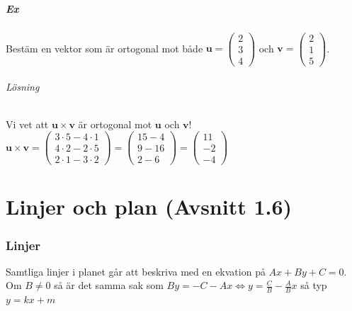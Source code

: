 \paragraph{Ex} Bestäm en vektor som är ortogonal mot både $\bm{u}=\begin{pmatrix}2\\3\\4\end{pmatrix}$ och $\bm{v}=\begin{pmatrix}2\\1\\5\end{pmatrix}$.
\subparagraph{Lösning} Vi vet att $\bm{u}\times \bm{v}$ är ortogonal mot $\bm{u}$ och $\bm{v}$!\\
$\bm{u}\times \bm{v}=\begin{pmatrix}
    3\cdot 5-4\cdot 1\\
    4\cdot 2 - 2\cdot 5\\
    2\cdot 1 - 3\cdot 2
\end{pmatrix} = 
\begin{pmatrix}
    15-4\\
    9-16\\
    2-6
\end{pmatrix} = \begin{pmatrix}11\\-2\\-4\end{pmatrix}$

\chapter{Linjer och plan (Avsnitt 1.6)}
\subsection{Linjer}
Samtliga linjer i planet går att beskriva med en ekvation på $Ax+By+C=0$.
Om $B\neq 0$ så är det samma sak som $By=-C-Ax \Leftrightarrow y=\frac{C}{B} - \frac{A}{B}x$ så typ $y=kx+m$\\


